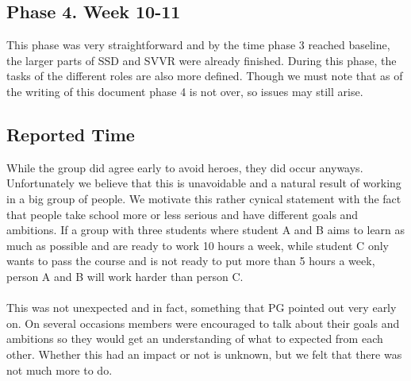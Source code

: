 \documentclass{article}
\begin{document}
    \subsection{Phase 4. Week 10-11}
        This phase was very straightforward and by the time phase 3 reached baseline, the larger parts of SSD and SVVR were already finished.
        During this phase, the tasks of the different roles are also more defined.
        Though we must note that as of the writing of this document phase 4 is not over, so issues may still arise.

    \subsection{Reported Time}
        While the group did agree early to avoid heroes, they did occur anyways.
        Unfortunately we believe that this is unavoidable and a natural result of working in a big group of people. We motivate this rather cynical statement with the fact that people take school more or less serious and have different goals and ambitions. If a group with three students where student A and B
        aims to learn as much as possible and are ready to work 10 hours a week, while student C only wants to
        pass the course and is not ready to put more than 5 hours a week, person A and B will work harder than person C.
        \\ \\
        This was not unexpected and in fact, something that PG pointed out very early on. On several occasions
        members were encouraged to talk about their goals and ambitions so they would get an understanding
        of what to expected from each other. Whether this had an impact or not is unknown, but we felt that there was not much more to do.
    
\end{document}
